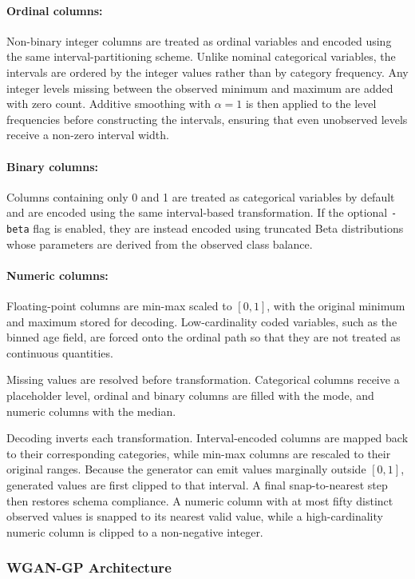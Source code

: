 \paragraph{Ordinal columns:}
Non-binary integer columns are treated as ordinal variables and encoded using
the same interval-partitioning scheme. Unlike nominal categorical variables,
the intervals are ordered by the integer values rather than by category
frequency. Any integer levels missing between the observed minimum and maximum
are added with zero count. Additive smoothing with $\alpha = 1$ is then
applied to the level frequencies before constructing the intervals, ensuring
that even unobserved levels receive a non-zero interval width.

\paragraph{Binary columns:}
Columns containing only 0 and 1 are treated as categorical variables by
default and are encoded using the same interval-based transformation. If the
optional \texttt{-beta} flag is enabled, they are instead encoded using
truncated Beta distributions whose parameters are derived from the observed
class balance.

\paragraph{Numeric columns:}
Floating-point columns are min-max scaled to $[0,1]$, with the original
minimum and maximum stored for decoding. Low-cardinality coded variables,
such as the binned age field, are forced onto the ordinal path so that they
are not treated as continuous quantities.

Missing values are resolved before transformation. Categorical columns
receive a placeholder level, ordinal and binary columns are filled with the
mode, and numeric columns with the median.

Decoding inverts each transformation. Interval-encoded columns are mapped
back to their corresponding categories, while min-max columns are rescaled
to their original ranges. Because the generator can emit values marginally
outside $[0,1]$, generated values are first clipped to that interval. A
final snap-to-nearest step then restores schema compliance. A numeric column
with at most fifty distinct observed values is snapped to its nearest valid
value, while a high-cardinality numeric column is clipped to a non-negative
integer.

\subsubsection{WGAN-GP Architecture}
\label{sec:methods:healthgan:arch}

